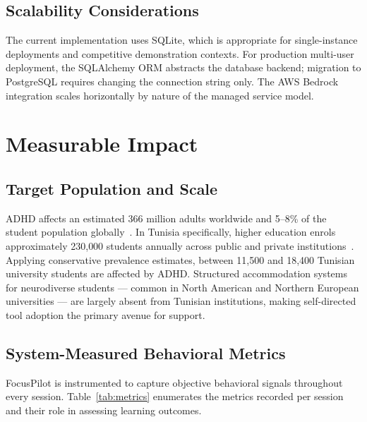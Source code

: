 \documentclass[conference]{IEEEtran}
\begin{document}
\subsection{Scalability Considerations}

The current implementation uses SQLite, which is appropriate for single-instance deployments and competitive demonstration contexts. For production multi-user deployment, the SQLAlchemy ORM abstracts the database backend; migration to PostgreSQL requires changing the connection string only. The AWS Bedrock integration scales horizontally by nature of the managed service model.

\section{Measurable Impact}

\subsection{Target Population and Scale}

ADHD affects an estimated 366 million adults worldwide and 5--8\% of the student population globally~\cite{fayyad2017cross,polanczyk2015adhd}. In Tunisia specifically, higher education enrols approximately 230{,}000 students annually across public and private institutions~\cite{mhesrTunisia2023}. Applying conservative prevalence estimates, between 11{,}500 and 18{,}400 Tunisian university students are affected by ADHD. Structured accommodation systems for neurodiverse students — common in North American and Northern European universities — are largely absent from Tunisian institutions, making self-directed tool adoption the primary avenue for support.

\subsection{System-Measured Behavioral Metrics}

FocusPilot is instrumented to capture objective behavioral signals throughout every session. Table~\ref{tab:metrics} enumerates the metrics recorded per session and their role in assessing learning outcomes.
\end{document}
